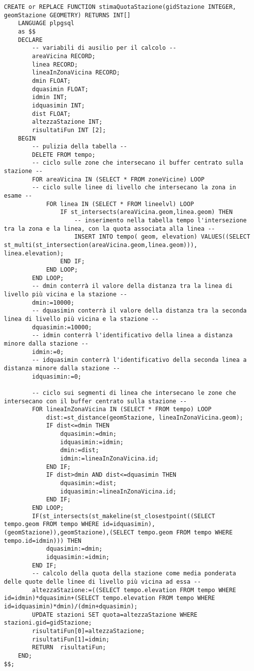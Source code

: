 \begin{lstlisting}[style=mySQL]
CREATE or REPLACE FUNCTION stimaQuotaStazione(gidStazione INTEGER, geomStazione GEOMETRY) RETURNS INT[]
	LANGUAGE plpgsql
	as $$
	DECLARE
		-- variabili di ausilio per il calcolo --
		areaVicina RECORD;
		linea RECORD;
		lineaInZonaVicina RECORD;
		dmin FLOAT;
		dquasimin FLOAT;
		idmin INT;
		idquasimin INT;
		dist FLOAT;
		altezzaStazione INT;
		risultatiFun INT [2];
	BEGIN
		-- pulizia della tabella --
		DELETE FROM tempo;
		-- ciclo sulle zone che intersecano il buffer centrato sulla stazione --
		FOR areaVicina IN (SELECT * FROM zoneVicine) LOOP
		-- ciclo sulle linee di livello che intersecano la zona in esame --
			FOR linea IN (SELECT * FROM lineelvl) LOOP
				IF st_intersects(areaVicina.geom,linea.geom) THEN
					-- inserimento nella tabella tempo l'intersezione tra la zona e la linea, con la quota associata alla linea --
					INSERT INTO tempo( geom, elevation) VALUES((SELECT st_multi(st_intersection(areaVicina.geom,linea.geom))), linea.elevation);
				END IF;
			END LOOP;
		END LOOP;
		-- dmin conterrà il valore della distanza tra la linea di livello più vicina e la stazione --
		dmin:=10000;        
		-- dquasimin conterrà il valore della distanza tra la seconda linea di livello più vicina e la stazione --
		dquasimin:=10000;   
		-- idmin conterrà l'identificativo della linea a distanza minore dalla stazione --
		idmin:=0;           
		-- idquasimin conterrà l'identificativo della seconda linea a distanza minore dalla stazione --
		idquasimin:=0;      

		-- ciclo sui segmenti di linea che intersecano le zone che intersecano con il buffer centrato sulla stazione --
		FOR lineaInZonaVicina IN (SELECT * FROM tempo) LOOP
			dist:=st_distance(geomStazione, lineaInZonaVicina.geom);
			IF dist<=dmin THEN
				dquasimin:=dmin;
				idquasimin:=idmin;
				dmin:=dist;
				idmin:=lineaInZonaVicina.id;
			END IF;
			IF dist>dmin AND dist<=dquasimin THEN
				dquasimin:=dist;
				idquasimin:=lineaInZonaVicina.id;
			END IF;
		END LOOP;
		IF(st_intersects(st_makeline(st_closestpoint((SELECT tempo.geom FROM tempo WHERE id=idquasimin),(geomStazione)),geomStazione),(SELECT tempo.geom FROM tempo WHERE tempo.id=idmin))) THEN
			dquasimin:=dmin;
			idquasimin:=idmin;
		END IF;
		-- calcolo della quota della stazione come media ponderata delle quote delle linee di livello più vicina ad essa --
		altezzaStazione:=((SELECT tempo.elevation FROM tempo WHERE id=idmin)*dquasimin+(SELECT tempo.elevation FROM tempo WHERE id=idquasimin)*dmin)/(dmin+dquasimin);
		UPDATE stazioni SET quota=altezzaStazione WHERE stazioni.gid=gidStazione;
		risultatiFun[0]=altezzaStazione;
		risultatiFun[1]=idmin;
		RETURN  risultatiFun;
	END;
$$;
\end{lstlisting}

